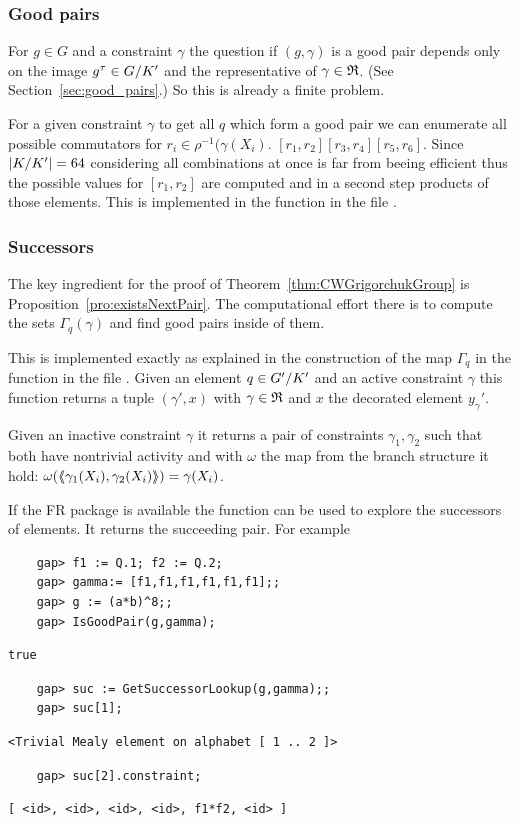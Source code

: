 \documentclass[a4paper,11pt]{amsart}
\begin{document}
\subsubsection{Good pairs}
For $g\in G$ and a constraint $\gamma$ the question if $(g,\gamma)$ is a good
pair depends only on the image $g^\tau\in{G/K'}$ and the representative
of $\gamma\in\mathfrak{R}$. (See Section~\ref{sec:good_pairs}.) So this is already a
finite problem. 

For a given constraint $\gamma$ to get all $q$ which form a good pair we can
enumerate all possible commutators for $r_i\in\rho^{-1}(\gamma(X_i)$.
$[r_1,r_2][r_3,r_4][r_5,r_6]$. Since $\lvert{K/K'}\rvert=64$ considering all 
combinations at once is far from beeing efficient thus the possible values for
$[r_1,r_2]$ are computed and in a second step products of those elements.
This is implemented in the function  in the file
.
\subsubsection{Successors}
The key ingredient for the proof of Theorem~\ref{thm:CWGrigorchukGroup} is
Proposition~\ref{pro:existsNextPair}. The computational effort there is
to compute the sets $\Gamma_q(\gamma)$ and find good pairs inside of them.

This is implemented exactly as explained in the construction of the map
$\Gamma_q$ in the function  in the file 
. Given an element $q\in{G'/K'}$ 
and an active constraint $\gamma$ this function returns a tuple $(\gamma',x)$ 
with $\gamma\in\mathfrak{R}$ and $x$ the decorated element $y_\gamma'$.

Given an inactive constraint $\gamma$ it returns a pair of constraints
$\gamma_1,\gamma_2$ such that both have nontrivial activity and with
$\omega$ the map from the branch structure it hold:
$\omega(\langle\negthickspace\langle\gamma_1(X_i),\gamma_2(X_i)\rangle\negthickspace\rangle)=\gamma(X_i)$. 

If the FR package is available
the function  can be used to explore the
successors of elements. It returns the succeeding pair. For example
 \begin{lstlisting}
    gap> f1 := Q.1; f2 := Q.2;
    gap> gamma:= [f1,f1,f1,f1,f1,f1];;
    gap> g := (a*b)^8;;
    gap> IsGoodPair(g,gamma);
\end{lstlisting}
\begin{verbatim}
true
\end{verbatim} 
\begin{lstlisting}
    gap> suc := GetSuccessorLookup(g,gamma);;    
    gap> suc[1];
\end{lstlisting}
\begin{verbatim}
<Trivial Mealy element on alphabet [ 1 .. 2 ]>
\end{verbatim} 
\begin{lstlisting}
    gap> suc[2].constraint;
\end{lstlisting}
\begin{verbatim}
[ <id>, <id>, <id>, <id>, f1*f2, <id> ]
\end{verbatim} 
\end{document}
